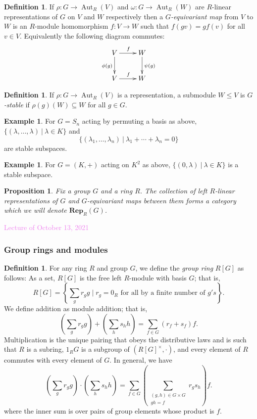 \documentclass{amsart}[12pt]
\def\Aut{\operatorname{Aut}}
\newcommand{\Oct}[1]{\textcolor{violet}{Lecture of October #1, 2021}}
\newcommand{\DEF}[1]{\emph{#1}\index{#1}}
\numberwithin{equation}{section}
\theoremstyle{plain} %
\newtheorem{prop}[equation]{Proposition}
\theoremstyle{definition}
\newtheorem{defn}[equation]{Definition}
\newtheorem{ex}[equation]{Example}
\theoremstyle{remark}
\newcommand{\sssec}[1]{\subsubsection{#1}}
\newcommand{\Rep}[2]{\mathbf{Rep}_{#1}(#2)}
\begin{document}
\begin{defn} If $\rho:G \to \Aut_R(V)$ and $\omega:G\to \Aut_R(W)$ are $R$-linear representations of $G$ on $V$ and $W$ respectively then a \DEF{$G$-equivariant map} from $V$ to $W$ is an $R$-module homomorphism $f: V \to W$ such that $f(gv)=gf(v)$ for all $v\in V$. Equivalently the following diagram commutes:
\[
\xymatrix{
V \ar[r]^f \ar[d]_{\phi(g)}& W \ar[d]^{\psi(g)}\\
V \ar[r]^f & W
}
\]
\end{defn}

\begin{defn} If $\rho:G \to \Aut_R(V)$ is a representation, a submodule $W\leq V$ is \DEF{$G$-stable} if $\rho(g)(W)\subseteq W$ for all $g\in G$.
\end{defn}

\begin{ex}
For $G=S_n$ acting by permuting a basis as above, $\{(\lambda,\dots,\lambda) \ | \ \lambda\in K\}$ and \[\{(\lambda_1,\dots,\lambda_n) \ | \ \lambda_1+\cdots+\lambda_n=0\}\] are stable subspaces.
\end{ex}

\begin{ex}
For $G=(K,+)$ acting on $K^2$ as above, $\{(0,\lambda) \ | \ \lambda\in K\}$ is a stable subspace.
\end{ex}

\begin{prop}
Fix a group $G$ and a ring $R$. The collection of left $R$-linear representations of $G$ and $G$-equivariant maps between them forms a category which we will denote $\Rep{R}{G}$.
\end{prop}

\Oct{13}

\sssec{Group rings and modules}


\begin{defn}
For any ring $R$ and group $G$,   we define the  {\em group ring} $R[G]$ as follows: 
As a set, $R[G]$ is the free left $R$-module with basis $G$; that is, 
$$
R[G]=\left\{ \sum_g r_g g \mid  r_g = 0_R \text{ for all by a finite number of }g's \right\}.
$$
We define addition as module addition; that is,
  $$
  \left(\sum_g r_g g \right) + \left(\sum_h s_h h \right) = \sum_{f \in G} \left(r_f + s_f \right) f.
  $$
  Multiplication is the unique pairing that obeys the distributive laws
  and is such that $R$ is a subring, $1_RG$ is a subgroup of $(R[G]^\times, \cdot)$, and every element of $R$ commutes with every element of $G$.
  In general, we have
  $$
  \left(\sum_g r_g g\right) \cdot \left(\sum_h s_h h \right) = \sum_{f \in G} \left(\sum_{\substack{(g,h) \in G \times G\\ gh= f}} r_gs_h\right)   f.
  $$
where the inner sum is over pairs of group elements whose product is $f$. 
\end{defn}
\end{document}
